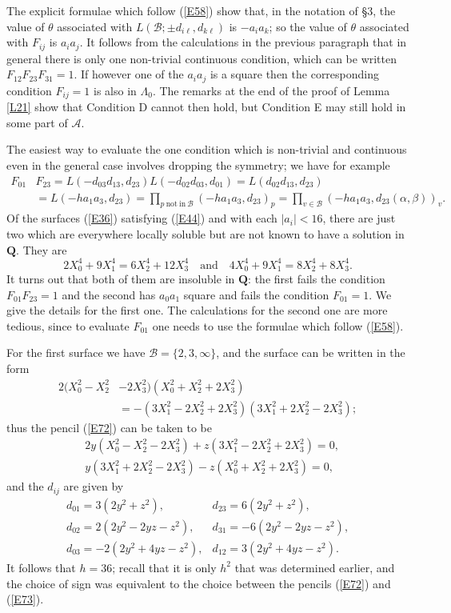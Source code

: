 \documentclass[12pt]{article}
\def\bQ{{\mathbf Q}}
\def\ga{{\alpha}}
\def\gb{{\beta}}
\def\gL{{\Lambda}}
\def\gt{{\theta}}
\def\sA{{\mathcal A}}
\def\sB{{\mathcal B}}
\begin{document}
The explicit formulae which follow (\ref{E58}) show that,
in the notation of \S3, the value of $\gt$ associated with
$L(\sB;\pm d_{i\ell},d_{k\ell})$ is $-a_ia_k$; so the value
of $\gt$ associated with $F_{ij}$ is $a_ia_j$. It follows
from the calculations in the previous paragraph that in
general there is only one non-trivial continuous condition,
which can be written $F_{12}F_{23}F_{31}=1$. If however one
of the $a_ia_j$ is a square then the corresponding condition
$F_{ij}=1$ is also in $\gL_0$. The remarks at the end of the
proof of Lemma \ref{L21} show that Condition D cannot then
hold, but Condition E may still hold in some part of $\sA$.

The easiest way to evaluate the one condition which is
non-trivial and continuous even in the general case involves
dropping the symmetry; we have for example
\begin{align*}
F_{01} & F_{23}=L(-d_{03}d_{13},d_{23})L(-d_{02}d_{03},d_{01})=L(d_{02}d_{13},d_{23}) \\
 & =L(-ha_1a_3,d_{23})=\prod_{p \mathrm{~not~in~} \sB}(-ha_1a_3,d_{23})_p=\prod_{v\in \sB}(-ha_1a_3,d_{23}(\ga,\gb))_v.
\end{align*}
Of the surfaces (\ref{E36}) satisfying (\ref{E44}) and with
each $|a_i|<16$, there are just two
which are everywhere locally soluble but are not known to have
a solution in $\bQ$. They are
\[ 2X_0^4+9X_1^4=6X_2^4+12X_3^4 \quad \mathrm{and}
\quad 4X_0^4+9X_1^4=8X_2^4+8X_3^4. \]
It turns out that both of them are insoluble in $\bQ$: the
first fails the condition $F_{01}F_{23}=1$ and the
second has $a_0a_1$ square and fails the condition $F_{01}=1$.
We give the details for the first one. The calculations for
the second one are more tedious, since to evaluate $F_{01}$
one needs to use the formulae which follow (\ref{E58}).

For the first surface we have $\sB=\{2,3,\infty\}$, and the
surface can be written in the form
\begin{align*}
2(X_0^2-X_2^2 & -2X_3^2)(X_0^2+X_2^2+2X_3^2) \\
 & =-(3X_1^2-2X_2^2+2X_3^2)(3X_1^2+2X_2^2-2X_3^2);
\end{align*}
thus the pencil (\ref{E72}) can be taken to be 
\begin{align*}
 & 2y(X_0^2-X_2^2-2X_3^2)+z(3X_1^2-2X_2^2+2X_3^2)=0, \\
 & y(3X_1^2+2X_2^2-2X_3^2)-z(X_0^2+X_2^2+2X_3^2)=0,
\end{align*}
and the $d_{ij}$ are given by
\[ \begin{array}{ll}
d_{01}=3(2y^2+z^2), & d_{23}=6(2y^2+z^2), \\
d_{02}=2(2y^2-2yz-z^2), & d_{31}=-6(2y^2-2yz-z^2), \\
d_{03}=-2(2y^2+4yz-z^2), & d_{12}=3(2y^2+4yz-z^2).
\end{array} \]
It follows that $h=36$; recall that it is only $h^2$ that was
determined earlier, and the choice of sign was
equivalent to the choice between the pencils (\ref{E72}) and
(\ref{E73}).
\end{document}
